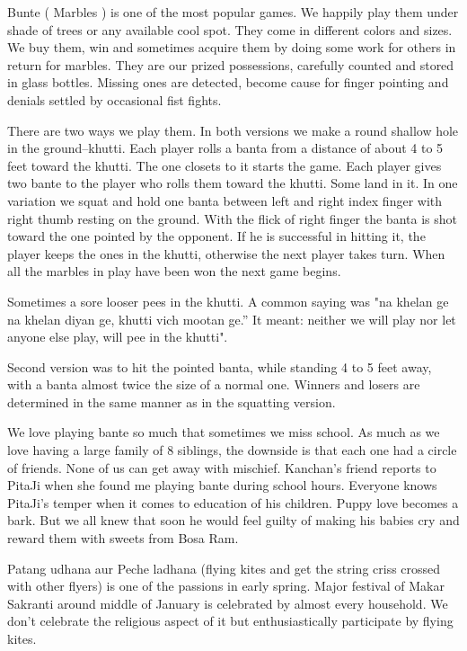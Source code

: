 Bunte ( Marbles ) is one of the most popular games. We happily play them
under shade of trees or any available cool spot. They come in different
colors and sizes. We buy them, win and sometimes acquire them by doing
some work for others in return for marbles. They are our prized
possessions, carefully counted and stored in glass bottles. Missing ones
are detected, become cause for finger pointing and denials settled by
occasional fist fights. 

There are two ways we play them. In both versions we make a round shallow
hole in the ground--khutti. Each player rolls a banta from a distance of
about 4 to 5 feet toward the khutti. The one closets to it starts the
game. Each player gives two bante to the player who rolls them toward the
khutti. Some land in it. In one variation we squat and hold one banta
between left and right index finger with right thumb resting on the
ground. With the flick of right finger the banta is shot toward the one
pointed by the opponent. If he is successful in hitting it, the player
keeps the ones in the khutti, otherwise the next player takes turn. When
all the marbles in play have been won the next game begins. 

Sometimes a sore looser pees in the khutti. A common saying was "na khelan
ge na khelan diyan ge, khutti vich mootan ge.” It meant: neither we will
play nor let anyone else play, will pee in the khutti".  

Second version was to hit the pointed banta, while standing 4 to 5 feet
away, with a banta almost twice the size of a normal one. Winners and
losers are determined in the same manner as in the squatting version. 

We love playing bante so much that sometimes we miss school. As much as we
love having a large family of 8 siblings, the downside is that each one
had a circle of friends. None of us can get away with mischief. Kanchan's
friend reports to PitaJi when she found me playing bante during school
hours. Everyone knows PitaJi's temper when it comes to education of his
children. Puppy love becomes a bark. But we all knew that soon he would
feel guilty of making his babies cry and reward them with sweets from Bosa
Ram. 

Patang udhana aur Peche  ladhana (flying kites and get the string criss
crossed with other flyers) is one of the passions in early spring.  Major
festival of Makar Sakranti around middle of January is celebrated by
almost every household. We don’t celebrate the religious aspect of it but
enthusiastically participate by flying kites. 

